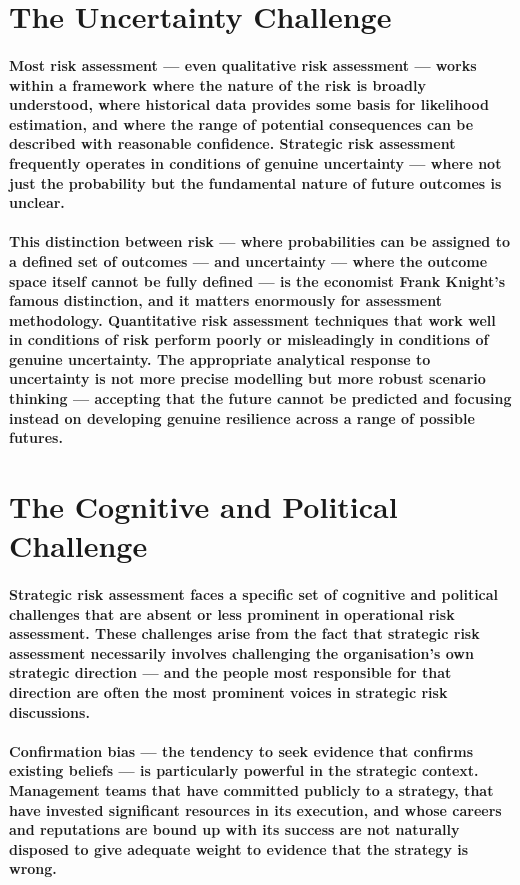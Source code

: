 \section{The Uncertainty Challenge}
\paragraph{Most risk assessment — even qualitative risk assessment — works within a framework where the nature of the risk is broadly understood, where historical data provides some basis for likelihood estimation, and where the range of potential consequences can be described with reasonable confidence. Strategic risk assessment frequently operates in conditions of genuine uncertainty — where not just the probability but the fundamental nature of future outcomes is unclear.}
\paragraph{This distinction between \textbf{risk} — where probabilities can be assigned to a defined set of outcomes — and \textbf{uncertainty} — where the outcome space itself cannot be fully defined — is the economist Frank Knight's famous distinction, and it matters enormously for assessment methodology. Quantitative risk assessment techniques that work well in conditions of risk perform poorly or misleadingly in conditions of genuine uncertainty. The appropriate analytical response to uncertainty is not more precise modelling but more robust scenario thinking — accepting that the future cannot be predicted and focusing instead on developing genuine resilience across a range of possible futures.}

\section{The Cognitive and Political Challenge}
\paragraph{Strategic risk assessment faces a specific set of cognitive and political challenges that are absent or less prominent in operational risk assessment. These challenges arise from the fact that strategic risk assessment necessarily involves challenging the organisation's own strategic direction — and the people most responsible for that direction are often the most prominent voices in strategic risk discussions.}
\paragraph{\textbf{Confirmation bias} — the tendency to seek evidence that confirms existing beliefs — is particularly powerful in the strategic context. Management teams that have committed publicly to a strategy, that have invested significant resources in its execution, and whose careers and reputations are bound up with its success are not naturally disposed to give adequate weight to evidence that the strategy is wrong.}
